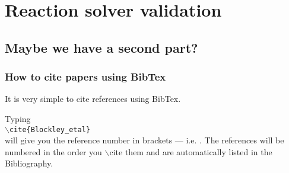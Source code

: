 \chapter{Reaction solver validation}\label{Reaction solver validation}

\section{Maybe we have a second part?}



\subsection{How to cite papers using BibTex}

It is very simple to cite references using BibTex.

Typing\\ {\tt $\backslash$cite\{Blockley\_etal\}}\\ will give you the reference number in brackets --- i.e. \cite{Blockley_etal}.
The references will be numbered in the order you $\backslash$cite them and are automatically listed 	in the Bibliography.
